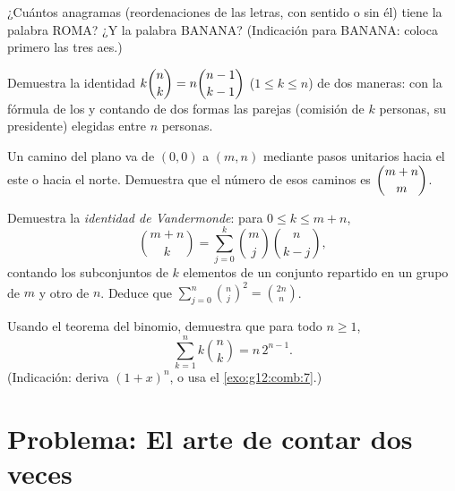 \begin{exercise}[$\star\star$]\label{exo:g12:comb:6}
¿Cuántos anagramas (reordenaciones de las letras, con sentido o sin él)
tiene la palabra ROMA? ¿Y la palabra BANANA? (Indicación para BANANA:
coloca primero las tres aes.)
\end{exercise}

\begin{exercise}[$\star\star$]\label{exo:g12:comb:7}
Demuestra la identidad $k\dbinom{n}{k} = n\dbinom{n-1}{k-1}$
($1 \leq k \leq n$) de dos maneras: con la fórmula de los  y
contando de dos formas las parejas (comisión de $k$ personas, su presidente)
elegidas entre $n$ personas.
\end{exercise}

\begin{exercise}[$\star\star$]\label{exo:g12:comb:8}
Un camino del plano va de $(0,0)$ a $(m, n)$ mediante pasos unitarios hacia
el este o hacia el norte. Demuestra que el número de esos caminos es
$\dbinom{m+n}{m}$.
\end{exercise}

\begin{exercise}[$\star\star\star$]\label{exo:g12:comb:9}
Demuestra la \emph{identidad de Vandermonde}: para $0 \leq k \leq m + n$,
\[
\binom{m+n}{k} = \sum_{j=0}^{k} \binom{m}{j}\binom{n}{k-j},
\]
contando los subconjuntos de $k$ elementos de un conjunto repartido en un
grupo de $m$ y otro de $n$. Deduce que
$\displaystyle\sum_{j=0}^{n}\binom{n}{j}^{\!2} = \binom{2n}{n}$.
\end{exercise}

\begin{exercise}[$\star\star\star$]\label{exo:g12:comb:10}
Usando el teorema del binomio, demuestra que para todo $n \geq 1$,
\[
\sum_{k=1}^{n} k \binom{n}{k} = n\,2^{n-1}.
\]
(Indicación: deriva $(1+x)^n$, o usa el \cref{exo:g12:comb:7}.)
\end{exercise}

\section{Problema: El arte de contar dos veces}

